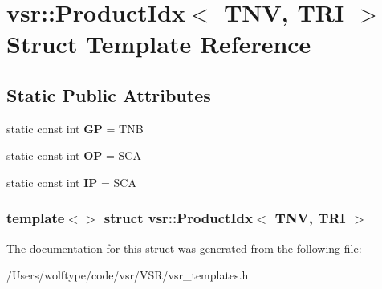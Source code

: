 \hypertarget{structvsr_1_1_product_idx_3_01_t_n_v_00_01_t_r_i_01_4}{\section{vsr\-:\-:Product\-Idx$<$ T\-N\-V, T\-R\-I $>$ Struct Template Reference}
\label{structvsr_1_1_product_idx_3_01_t_n_v_00_01_t_r_i_01_4}
}
\subsection*{Static Public Attributes}
\begin{DoxyCompactItemize}
\item 
\hypertarget{structvsr_1_1_product_idx_3_01_t_n_v_00_01_t_r_i_01_4_afa2f455e0ab7d22cbae942a74308a3be}{static const int {\bfseries G\-P} = T\-N\-B}\label{structvsr_1_1_product_idx_3_01_t_n_v_00_01_t_r_i_01_4_afa2f455e0ab7d22cbae942a74308a3be}

\item 
\hypertarget{structvsr_1_1_product_idx_3_01_t_n_v_00_01_t_r_i_01_4_abf06bf98bbce8d32e8c36ffe51029399}{static const int {\bfseries O\-P} = S\-C\-A}\label{structvsr_1_1_product_idx_3_01_t_n_v_00_01_t_r_i_01_4_abf06bf98bbce8d32e8c36ffe51029399}

\item 
\hypertarget{structvsr_1_1_product_idx_3_01_t_n_v_00_01_t_r_i_01_4_ae216cab827c0fd0b6d6c6e7bac7e623d}{static const int {\bfseries I\-P} = S\-C\-A}\label{structvsr_1_1_product_idx_3_01_t_n_v_00_01_t_r_i_01_4_ae216cab827c0fd0b6d6c6e7bac7e623d}

\end{DoxyCompactItemize}
\subsubsection*{template$<$$>$ struct vsr\-::\-Product\-Idx$<$ T\-N\-V, T\-R\-I $>$}



The documentation for this struct was generated from the following file\-:\begin{DoxyCompactItemize}
\item 
/\-Users/wolftype/code/vsr/\-V\-S\-R/vsr\-\_\-templates.\-h\end{DoxyCompactItemize}
